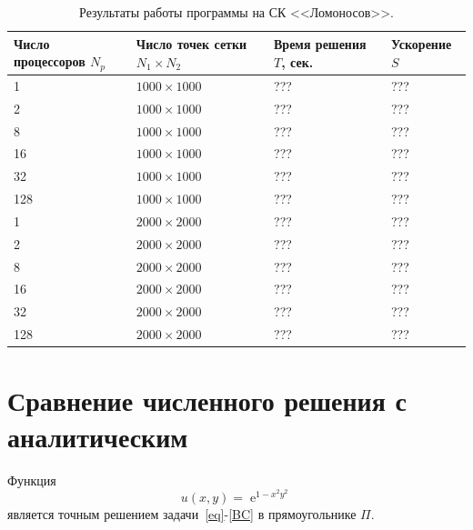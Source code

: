 \documentclass[11pt]{article}
\numberwithin{equation}{section}
\theoremstyle{plain}
\theoremstyle{definition}
\DeclareMathOperator{\expon}{e}
\begin{document}
\begin{table}[h]
\centering
\begin{tabular}{|l|l|l|l|}\hline
Число процессоров $N_p$ & Число точек сетки $N_1 \times N_2$ & Время решения $T$, сек. & Ускорение $S$ \\ \hline
1                       & $1000 \times 1000$                 & ???                     & ???           \\
2                       & $1000 \times 1000$                 & ???                     & ???           \\
8                       & $1000 \times 1000$                 & ???                     & ???           \\
16                      & $1000 \times 1000$                 & ???                     & ???           \\
32                      & $1000 \times 1000$                 & ???                     & ???           \\
128                     & $1000 \times 1000$                 & ???                     & ???           \\ \hline
1                       & $2000 \times 2000$                 & ???                     & ???           \\
2                       & $2000 \times 2000$                 & ???                     & ???           \\
8                       & $2000 \times 2000$                 & ???                     & ???           \\
16                      & $2000 \times 2000$                 & ???                     & ???           \\
32                      & $2000 \times 2000$                 & ???                     & ???           \\
128                     & $2000 \times 2000$                 & ???                     & ???           \\ \hline
\end{tabular}
    \caption{Результаты работы программы на СК <<Ломоносов>>.}
\label{tab_mpi}
\end{table}

\section{Сравнение численного решения с аналитическим}
Функция \[u(x,y)=\expon^{1-x^2y^2}\]
является точным решением задачи~\eqref{eq}-\eqref{BC} в прямоугольнике \(\Pi.\)
\end{document}
